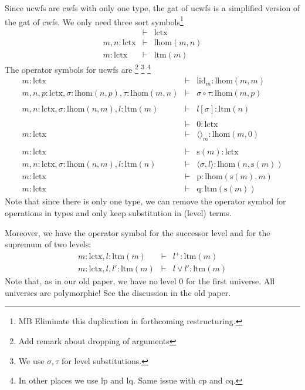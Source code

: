 \documentclass[11pt,a4paper]{article}
\theoremstyle{definition}
\def\lhom{\mathrm{lhom}}
\def\lHom{\mathrm{lhom}}
\def\lctx{\mathrm{lctx}}
\def\lty{\mathrm{level}}
\def\ltm{\mathrm{ltm}}
\def\lp{\mathrm{lp}}
\def\lq{\mathrm{lq}}
\def\s{\mathrm{s}}
\def\lid{\mathrm{lid}}
\def\cp{\mathrm{cp}}
\def\cq{\mathrm{cq}}
\newcommand{\tuple}[1]{\langle #1 \rangle}
\def\p{\mathrm{p}}
\def\q{\mathrm{q}}
\begin{document}
Since ucwfs are cwfs with only one type, the gat of ucwfs is a simplified version of the gat of cwfs. We only need three sort symbols\footnote{%
MB Eliminate this duplication in forthcoming restructuring.} 
\begin{eqnarray*}
&\vdash& \lctx\\
m, n : \lctx &\vdash& \lHom(m,n)\\
m : \lctx &\vdash& \ltm(m)
\end{eqnarray*}
The operator symbols for ucwfs are
\footnote{Add remark about dropping of arguments}
\footnote{We use  $\sigma,\tau$ for level substitutions.}
\footnote{In other places we use $\lp$ and $\lq$. Same issue with $\cp$ and $\cq$.}
\begin{eqnarray*}
m : \lctx &\vdash& \lid_m : \lhom(m,m)\\
m, n, p : \lctx, \sigma : \lhom(n,p), \tau : \lhom(m,n) &\vdash&
\sigma \circ \tau : \lhom(m,p)\\
&&\\
m,n: \lctx, \sigma : \lhom(n,m), l :\ltm(m) &\vdash&  l[\sigma] : \ltm(n)\\
&&\\
&\vdash& 0 : \lctx\\
m : \lctx &\vdash& \tuple{}_m : \lhom(m,0)\\
&&\\
m : \lctx &\vdash& \s(m) : \lctx\\
m,n : \lctx, \sigma : \lhom(n,m), l:\ltm(n) &\vdash& \tuple{\sigma,l} : \lhom(n,\s(m))\\
m : \lctx &\vdash& \p: \lhom(\s(m),m)\\
m : \lctx &\vdash& \q: \ltm(\s(m))
\end{eqnarray*}
Note that since there is only one type, we can remove the operator symbol for operations in types and only keep substitution in (level) terms.

Moreover, we have the operator symbol for the successor level and for the supremum of two levels:
\begin{eqnarray*}
m : \lctx, l : \ltm(m) &\vdash& l^+ : \ltm(m)\\
m : \lctx, l,l' : \ltm(m) &\vdash& l \vee l' : \ltm(m)
\end{eqnarray*}
Note that, as in our old paper, we have no level 0 for the first universe. All universes are polymorphic! See the discussion in the old paper.
\end{document}
